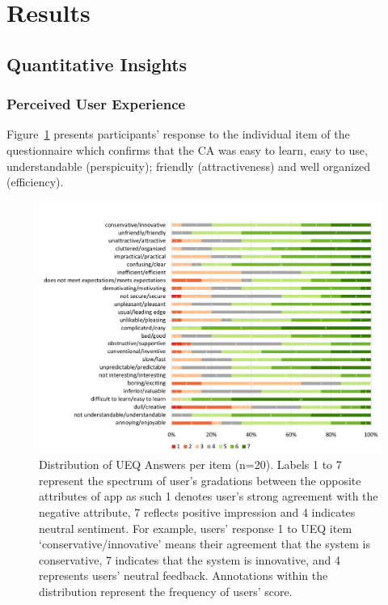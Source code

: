 
\section{Results}
    \subsection{Quantitative Insights}\label{app:quantitative_insights}
        \subsubsection{Perceived User Experience}
        
        
        
        Figure~\ref{fig:ueq-distribution} presents participants' response to the individual item of the questionnaire which confirms that the \ac{CA} was easy to learn, easy to use, understandable (perspicuity); friendly (attractiveness) and well organized (efficiency).
            \begin{figure}[t]
                \centering
                \includegraphics[clip, trim=0cm 0cm 0.25cm 0.25cm, width=\textwidth]{figures/ueq-distribution.pdf}
                \caption{Distribution of UEQ Answers per item (n=20). Labels 1 to 7 represent the spectrum of user's gradations between the opposite attributes of \acl{app} as such 1 denotes user's strong agreement with the negative attribute, 7 reflects positive impression and 4 indicates neutral sentiment. For example, users' response 1 to UEQ item `conservative/innovative' means their agreement that the system is conservative, 7 indicates that the system is innovative, and 4 represents users' neutral feedback. Annotations within the distribution represent the frequency of users' score.}
                \label{fig:ueq-distribution}
            \end{figure}
        
